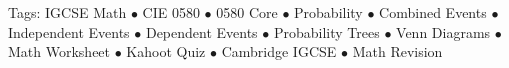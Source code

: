 \documentclass[11pt,a4paper]{article}
\begin{document}
\vspace{14pt}
\begin{center}
  \sffamily\scriptsize\textcolor{textmuted}{
    Tags: IGCSE Math $\bullet$ CIE 0580 $\bullet$ 0580 Core $\bullet$ Probability $\bullet$ Combined Events $\bullet$ Independent Events $\bullet$ Dependent Events $\bullet$ Probability Trees $\bullet$ Venn Diagrams $\bullet$ Math Worksheet $\bullet$ Kahoot Quiz $\bullet$ Cambridge IGCSE $\bullet$ Math Revision
  }
\end{center}
\end{document}
